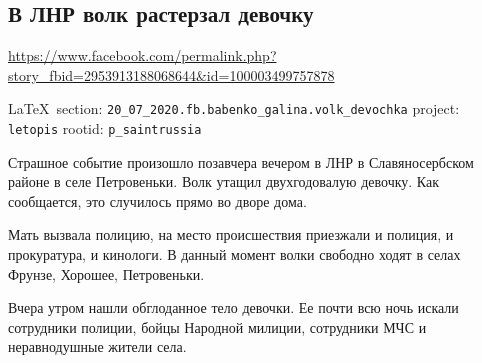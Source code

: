  
 

\subsection{В ЛНР волк растерзал девочку}
\url{https://www.facebook.com/permalink.php?story_fbid=2953913188068644&id=100003499757878}
  
\vspace{0.5cm}
{\small\LaTeX~section: \verb|20_07_2020.fb.babenko_galina.volk_devochka| project: \verb|letopis| rootid: \verb|p_saintrussia|}
\vspace{0.5cm}

Страшное событие произошло позавчера вечером в ЛНР в Славяносербском районе в
селе Петровеньки. Волк утащил двухгодовалую девочку. Как сообщается, это
случилось прямо во дворе дома.

Мать вызвала полицию, на место происшествия приезжали и полиция, и прокуратура,
и кинологи. В данный момент волки свободно ходят в селах Фрунзе, Хорошее,
Петровеньки.

Вчера утром нашли обглоданное тело девочки. Ее почти всю ночь искали сотрудники
полиции, бойцы Народной милиции, сотрудники МЧС и неравнодушные жители села.
  
